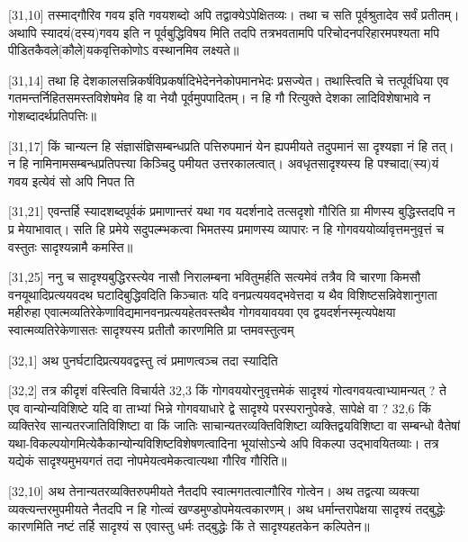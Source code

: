 [31,10] तस्माद्गौरिव गवय इति गवयशब्दो अपि तद्वाक्येऽपेक्षितव्यः। तथा च सति पूर्वश्रुतादेव सर्वं प्रतीतम्। अथापि स्यादयं(दस्य)गवय इति न पूर्वबुद्धिविषय%
मिति तदपि तत्रभवतामपि परिचोदनपरिहारमपश्यता%
मपि
पीडितकैवले[कौले]यकवृत्तिकोणोऽ%
वस्थानमिव%
लक्ष्यते॥

[31,14] तथा हि देशकालसन्निकर्षविप्रकर्षादिभेदेननेकोपमानभेदः प्रसज्येत। तथास्त्विति चे%
त्तत्पूर्वधिया एव गतमन्तर्निहितसमस्तविशेषमेव%
हि वा नेयौ पूर्वमुपपादितम्। न हि गौ%
रित्युक्ते देशका%
लादिविशेषाभावे न गोशब्दादर्थप्रतिपत्तिः॥

[31,17] किं चान्यत्न हि संज्ञासंज्ञिसम्बन्धप्रति%
पत्तिरुपमानं येन ह्यपमीयते तदुपमानं सा%
दृश्यज्ञा%
नं हि तत्। न हि नामिनामसम्बन्धप्रतिपत्त्या किञ्चिदु%
पमीयत उत्तरकालत्वात्। अवधृतसादृश्यस्य हि पश्चादा(स्य)यं गवय इत्येवं सो अपि निपत%
ति

[31,21] एवन्तर्हि स्यादशब्दपूर्वकं प्रमाणान्तरं यथा गव%
यदर्शनादे%
तत्सदृशो गौरिति ग्रा%
मीणस्य बुद्धिस्तदपि न
प्र%
मेयाभावात्। सति हि प्रमेये सदुपल्म्भकत्वा%
भिमतस्य प्रमाणस्य व्यापारः न हि गोगवययोर्व्यावृत्तमनुवृत्तं च%
वस्तुतः सादृश्यन्नामै%
कमस्ति॥

[31,25] ननु च सादृश्यबुद्धिरस्त्येव नासौ निरालम्बना भवितुमर्हति%
सत्यमेवं तत्रैव वि%
चारणा किमसौ वनयूथादिप्रत्ययवदथ घटादिबुद्धिवदिति किञ्चातः यदि वनप्रत्ययवद्भवेत्तदा%
य%
थैव विशिष्टसन्निवेशानुगता महीरुहा एवात्मव्यतिरेकेणाविद्यमानवनप्रत्ययहेतवस्तथैव गोगवयावयवा एव द्वयदर्शनस्मृत्यपेक्षया स्वात्मव्यतिरेकेणासतः सादृश्यस्य
प्रतीतौ कारणमिति प्रा%
प्तमवस्तुत्वम्

[32,1] अथ पुनर्घटादिप्रत्ययवद्वस्तु%
त्वं%
प्रमाणत्वञ्च तदा स्यादिति

[32,2] तत्र कीदृशं वस्त्विति विचार्यते 32,3  किं गोगवययोरनुवृत्तमेकं सादृश्यं गोत्वगवयत्वाभ्यामन्यत्%
? ते एव वान्योन्यविशिष्टे %
यदि वा %
ताभ्यां भिन्ने गोगवयाधारे द्वे सादृश्ये परस्परानुपेक्डे, सापेक्षे वा ? 32,6  किं व्यक्तिरेव सान्यतरजातिविशिष्टा वा किं जातिः साचान्यतरव्यक्तिविशिष्टा व्यक्तिद्वयविशिष्टा वा सम्बन्धो वैतेषां यथा-विकल्पयोगमित्येकैकान्योन्यविशिष्टविशेषणत्वादिना भूयांसोऽन्ये अपि विकल्पा उद्भावयितव्याः। तत्र यद्येकं सादृश्यमुभयगतं तदा नोपमेयत्वमेकत्वात्यथा गौरिव गौरिति॥

[32,10] अथ तेनान्यतरव्यक्तिरुपमीयते नैतदपि स्वात्मगतत्वात्गौरिव गोत्वेन। अथ तद्वत्या व्यक्त्या व्यक्त्यन्तरमुपमीयते नैतदपि न हि गोत्व्वं खण्डमुण्डोपमेयत्वकारणम्। अथ धर्मान्तरापेक्षया सादृश्यं तद्बुद्धेः कारणमिति नष्टं तर्हि सादृश्यं स एवास्तु धर्मः तद्बुद्धेः किं ते सादृश्यहतकेन कल्पितेन॥

